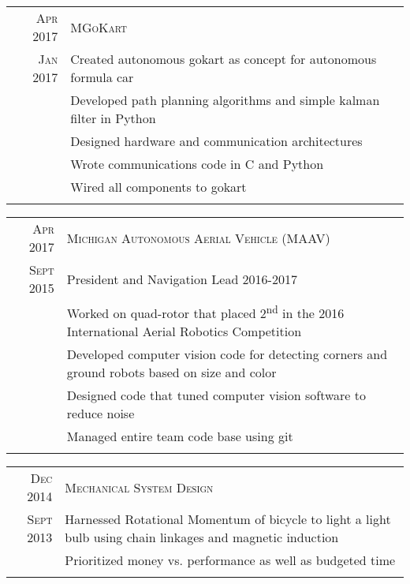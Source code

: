 \documentclass[a4paper,10pt]{article} %
\begin{document}
\begin{tabular}{r|p{13cm}}
\hspace{4pt}\textsc{Apr 2017} & \textsc{MGoKart} \\
\textsc{Jan 2017} & \footnotesize{Created autonomous gokart as concept for autonomous formula car} \\
& \footnotesize{Developed path planning algorithms and simple kalman filter in Python} \\
& \footnotesize{Designed hardware and communication architectures} \\
& \footnotesize{Wrote communications code in C and Python} \\
& \footnotesize{Wired all components to gokart} \\
\multicolumn{2}{c}{} \\
\end{tabular}


\begin{tabular}{r|p{13cm}}
\textsc{Apr 2017} & \textsc{Michigan Autonomous Aerial Vehicle (MAAV)} \\
\textsc{Sept 2015} & \footnotesize{President and Navigation Lead 2016-2017} \\
& \footnotesize{Worked on quad-rotor that placed 2\textsuperscript{nd} in the
  2016 International Aerial Robotics Competition} \\
& \footnotesize{Developed computer vision code for detecting corners and
  ground robots based on size and color} \\
& \footnotesize{Designed code that tuned computer vision software to reduce noise} \\
& \footnotesize{Managed entire team code base using git} \\
\multicolumn{2}{c}{} \\
\end{tabular}


\begin{tabular}{r|p{13cm}}
\textsc{Dec	2014} & \textsc{Mechanical System Design} \\
\textsc{Sept 2013} & \footnotesize{Harnessed Rotational Momentum of bicycle to
  light a light bulb using chain linkages and magnetic induction} \\
& \footnotesize{Prioritized money vs. performance as well as budgeted time} \\
\multicolumn{2}{c}{} \\
\end{tabular}
\end{document}
